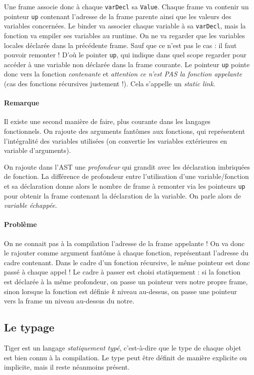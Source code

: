 \documentclass{article}
\begin{document}
Une frame associe donc à chaque \texttt{varDecl} sa \texttt{Value}. Chaque frame va contenir un pointeur \texttt{up} contenant l'adresse de la frame parente ainsi que les valeurs des variables concernées. Le binder va associer chaque variable à sa \texttt{varDecl}, mais la fonction va empiler ses variables au runtime. On ne va regarder que les variables locales déclarée dans la précédente frame. Sauf que ce n'est pas le cas : il faut pouvoir remonter ! D'où le pointer \texttt{up}, qui indique dans quel scope regarder pour accéder à une variable non déclarée dans la frame courante. Le pointeur \texttt{up} pointe donc vers la fonction \emph{contenante} et \emph{attention ce n'est PAS la fonction appelante} (cas des fonctions récursives justement !). Cela s'appelle un \emph{static link}.


\paragraph{Remarque}
Il existe une second manière de faire, plus courante dans les langages fonctionnels. On rajoute des arguments fantômes aux fonctions, qui représentent l'intégralité des variables utilisées (on convertie les variables extérieures en variable d'arguments).
\bigskip

On rajoute dans l'AST une \emph{profondeur} qui grandit avec les déclaration imbriquées de fonction. La différence de profondeur entre l'utilisation d'une variable/fonction et sa déclaration donne alors le nombre de frame à remonter via les pointeurs \texttt{up} pour obtenir la frame contenant la déclaration de la variable. On parle alors de \emph{variable échappée}.

\paragraph{Problème} On ne connait pas à la compilation l'adresse de la frame appelante ! On va donc le rajouter comme argument fantôme à chaque fonction, représentant l'adresse du cadre contenant. Dans le cadre d'un fonction récursive, le même pointeur est donc passé à chaque appel ! Le cadre à passer est choisi statiquement : si la fonction est déclarée à la même profondeur, on passe un pointeur vers notre propre frame, sinon lorsque la fonction est définie $k$ niveau au-dessus, on passe une pointeur vers la frame un niveau au-dessus du notre.

\subsection{Le typage}
Tiger est un langage \emph{statiquement typé}, c'est-à-dire que le type de chaque objet est bien connu à la compilation. Le type peut être définit de manière explicite ou implicite, mais il reste néanmoins présent.
\end{document}
